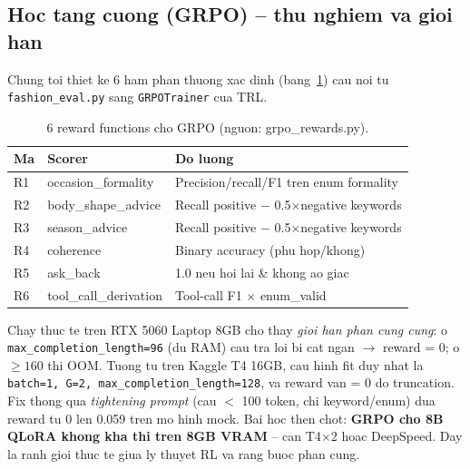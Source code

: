 \documentclass[12pt,a4paper]{article}
\begin{document}
\subsection{Hoc tang cuong (GRPO) -- thu nghiem va gioi han}
Chung toi thiet ke 6 ham phan thuong xac dinh (bang~\ref{tab:reward}) cau noi tu
\texttt{fashion\_eval.py} sang \texttt{GRPOTrainer} cua TRL.
\begin{table}[H]
  \centering
  \caption{6 reward functions cho GRPO (nguon: grpo\_rewards.py).}
  \label{tab:reward}
  \begin{tabular}{llp{6cm}}
    \toprule
    Ma & Scorer & Do luong \\
    \midrule
    R1 & occasion\_formality & Precision/recall/F1 tren enum formality \\
    R2 & body\_shape\_advice & Recall positive $-$ 0.5$\times$negative keywords \\
    R3 & season\_advice & Recall positive $-$ 0.5$\times$negative keywords \\
    R4 & coherence & Binary accuracy (phu hop/khong) \\
    R5 & ask\_back & 1.0 neu hoi lai \& khong ao giac \\
    R6 & tool\_call\_derivation & Tool-call F1 $\times$ enum\_valid \\
    \bottomrule
  \end{tabular}
\end{table}
Chay thuc te tren RTX 5060 Laptop 8GB cho thay \emph{gioi han phan cung cung}: o
\texttt{max\_completion\_length=96} (du RAM) cau tra loi bi cat ngan $\rightarrow$ reward = 0;
o $\ge 160$ thi OOM. Tuong tu tren Kaggle T4 16GB, cau hinh fit duy nhat la
\texttt{batch=1, G=2, max\_completion\_length=128}, va reward van = 0 do truncation. Fix
thong qua \emph{tightening prompt} (cau $<$ 100 token, chi keyword/enum) dua reward tu 0 len
0.059 tren mo hinh mock. Bai hoc then chot: \textbf{GRPO cho 8B QLoRA khong kha thi tren 8GB
VRAM} -- can T4$\times$2 hoac DeepSpeed. Day la ranh gioi thuc te giua ly thuyet RL va rang
buoc phan cung.
\end{document}
